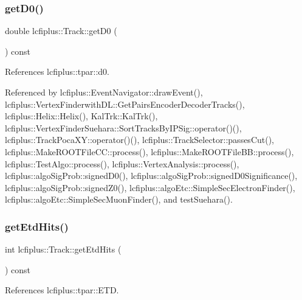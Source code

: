\subsubsection{get\+D0()}
{\footnotesize\ttfamily double lcfiplus\+::\+Track\+::get\+D0 (\begin{DoxyParamCaption}{ }\end{DoxyParamCaption}) const\hspace{0.3cm}{\ttfamily [inline]}}



References lcfiplus\+::tpar\+::d0.



Referenced by lcfiplus\+::\+Event\+Navigator\+::draw\+Event(), lcfiplus\+::\+Vertex\+Finderwith\+D\+L\+::\+Get\+Pairs\+Encoder\+Decoder\+Tracks(), lcfiplus\+::\+Helix\+::\+Helix(), Kal\+Trk\+::\+Kal\+Trk(), lcfiplus\+::\+Vertex\+Finder\+Suehara\+::\+Sort\+Tracks\+By\+I\+P\+Sig\+::operator()(), lcfiplus\+::\+Track\+Poca\+X\+Y\+::operator()(), lcfiplus\+::\+Track\+Selector\+::passes\+Cut(), lcfiplus\+::\+Make\+R\+O\+O\+T\+File\+C\+C\+::process(), lcfiplus\+::\+Make\+R\+O\+O\+T\+File\+B\+B\+::process(), lcfiplus\+::\+Test\+Algo\+::process(), lcfiplus\+::\+Vertex\+Analysis\+::process(), lcfiplus\+::algo\+Sig\+Prob\+::signed\+D0(), lcfiplus\+::algo\+Sig\+Prob\+::signed\+D0\+Significance(), lcfiplus\+::algo\+Sig\+Prob\+::signed\+Z0(), lcfiplus\+::algo\+Etc\+::\+Simple\+Sec\+Electron\+Finder(), lcfiplus\+::algo\+Etc\+::\+Simple\+Sec\+Muon\+Finder(), and test\+Suehara().

\mbox{\label{classlcfiplus_1_1Track_a493c7493527821d28791a0ae6568cb06}} 
\subsubsection{get\+Etd\+Hits()}
{\footnotesize\ttfamily int lcfiplus\+::\+Track\+::get\+Etd\+Hits (\begin{DoxyParamCaption}{ }\end{DoxyParamCaption}) const\hspace{0.3cm}{\ttfamily [inline]}}



References lcfiplus\+::tpar\+::\+E\+TD.

\mbox{\label{classlcfiplus_1_1Track_ab13a05db3d994dbd7d32ffd5d23ea757}} 
